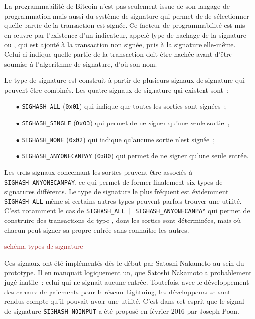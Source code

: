 
La programmabilité de Bitcoin n'est pas seulement issue de son langage de programmation mais aussi du système de signature qui permet de de sélectionner quelle partie de la transaction est signée. Ce facteur de programmabilité est mis en œuvre par l'existence d'un indicateur, appelé type de hachage de la signature ou , qui est ajouté à la transaction non signée, puis à la signature elle-même. Celui-ci indique quelle partie de la transaction doit être hachée avant d'être soumise à l'algorithme de signature, d'où son nom.

Le type de signature est construit à partir de plusieurs signaux de signature qui peuvent être combinés. Les quatre signaux de signature qui existent sont~:

\begin{itemize}
\item[$\bullet$] \texttt{SIGHASH\_ALL} (\texttt{0x01}) qui indique que toutes les sorties sont signées~;
\item[$\bullet$] \texttt{SIGHASH\_SINGLE} (\texttt{0x03}) qui permet de ne signer qu'une seule sortie~;
\item[$\bullet$] \texttt{SIGHASH\_NONE} (\texttt{0x02}) qui indique qu'aucune sortie n'est signée~;
\item[$\bullet$] \texttt{SIGHASH\_ANYONECANPAY} (\texttt{0x80}) qui permet de ne signer qu'une seule entrée.
\end{itemize}

Les trois signaux concernant les sorties peuvent être associés à \texttt{SIGHASH\_ANYONECANPAY}, ce qui permet de former finalement six types de signatures différents. Le type de signature le plus fréquent est évidemment \texttt{SIGHASH\_ALL} même si certains autres types peuvent parfois trouver une utilité. C'est notamment le cas de \texttt{SIGHASH\_ALL | SIGHASH\_ANYONECANPAY} qui permet de construire des transactions de type , dont les sorties sont déterminées, mais où chacun peut signer sa propre entrée sans connaître les autres.

\textcolor{brown}{schéma types de signature}


Ces signaux ont été implémentés dès le début par Satoshi Nakamoto au sein du prototype. Il en manquait logiquement un, que Satoshi Nakamoto a probablement jugé inutile~: celui qui ne signait aucune entrée. Toutefois, avec le développement des canaux de paiements pour le réseau Lightning, les développeurs se sont rendus compte qu'il pouvait avoir une utilité. C'est dans cet esprit que le signal de signature \texttt{SIGHASH\_NOINPUT} a été proposé en février 2016 par Joseph Poon.


